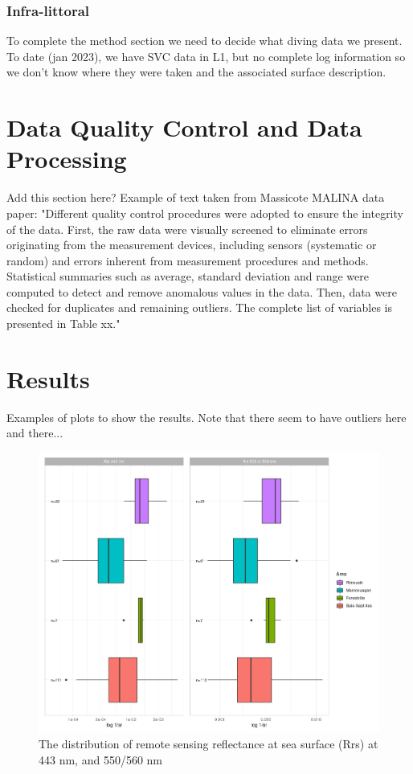 \documentclass[essd, manuscript]{copernicus}
\begin{document}
\subsubsection{Infra-littoral}
To complete the method section we need to decide what diving data we present. To date (jan 2023), we have SVC data in L1, but no complete log information so we don't know where they were taken and the associated surface description.

\section{Data Quality Control and Data Processing}
Add this section here? Example of text taken from Massicote MALINA data paper: "Different quality control procedures were adopted to ensure the integrity of the data. First, the raw data were visually screened to eliminate errors originating from the measurement devices, including sensors (systematic or random) and errors inherent from measurement procedures and methods. Statistical summaries such as average, standard deviation and range were computed to detect and remove anomalous values in the data. Then, data were checked for duplicates and remaining outliers. The complete list of variables is presented in Table xx."

\section{Results}
Examples of plots to show the results. Note that there seem to have outliers here and there...


\begin{figure}[t]
    \includegraphics[width=12cm]{Figures/boxplot_Rrs.png}
    \caption{The distribution of remote sensing reflectance at sea surface (Rrs) at 443 nm, and 550/560 nm }
    \label{fig:Rrs443}
\end{figure}
\end{document}
